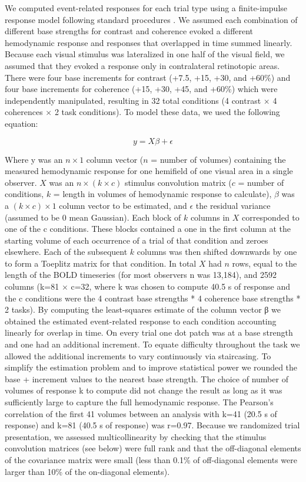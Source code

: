 \documentclass{report}
\begin{document}
We computed event-related responses for each trial type using a finite-impulse response model \citep{Zarahn1997-jc} following standard procedures \citep{Gardner2005-pg}. We assumed each combination of different base strengths for contrast and coherence evoked a different hemodynamic response and responses that overlapped in time summed linearly. Because each visual stimulus was lateralized in one half of the visual field, we assumed that they evoked a response only in contralateral retinotopic areas. There were four base increments for contrast (+7.5, +15, +30, and +60\%) and four base increments for coherence (+15, +30, +45, and +60\%) which were independently manipulated, resulting in 32 total conditions (4 contrast $\times$ 4 coherences $\times$ 2 task conditions). To model these data, we used the following equation:

\begin{equation}
    y=X\beta + \epsilon
\end{equation}

Where y was an $n\times1$ column vector ($n$ = number of volumes) containing the measured hemodynamic response for one hemifield of one visual area in a single observer. $X$ was an $n\times (k\times c)$ stimulus convolution matrix ($c$ = number of conditions, $k$ = length in volumes of hemodynamic response to calculate), $\beta$ was a $(k\times c)\times 1$ column vector to be estimated, and $\epsilon$ the residual variance (assumed to be 0 mean Gaussian). Each block of $k$ columns in $X$ corresponded to one of the c conditions. These blocks contained a one in the first column at the starting volume of each occurrence of a trial of that condition and zeroes elsewhere. Each of the subsequent $k$ columns was then shifted downwards by one to form a Toeplitz matrix for that condition. In total $X$ had $n$ rows, equal to the length of the BOLD timeseries (for most observers n was 13,184), and 2592 columns (k=81 $\times$ c=32, where k was chosen to compute 40.5 s of response and the c conditions were the 4 contrast base strengths * 4 coherence base strengths * 2 tasks). By computing the least-squares estimate of the column vector β we obtained the estimated event-related response to each condition accounting linearly for overlap in time. On every trial one dot patch was at a base strength and one had an additional increment. To equate difficulty throughout the task we allowed the additional increments to vary continuously via staircasing. To simplify the estimation problem and to improve statistical power we rounded the base + increment values to the nearest base strength. The choice of number of volumes of response k to compute did not change the result as long as it was sufficiently large to capture the full hemodynamic response. The Pearson’s correlation of the first 41 volumes between an analysis with k=41 (20.5 s of response) and k=81 (40.5 s of response) was r=0.97.  Because we randomized trial presentation, we assessed multicollinearity by checking that the stimulus convolution matrices (see below) were full rank and that the off-diagonal elements of the covariance matrix were small (less than 0.1\% of off-diagonal elements were larger than 10\% of the on-diagonal elements).
\end{document}
